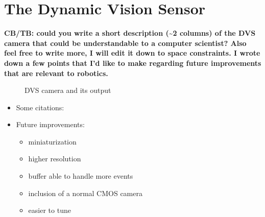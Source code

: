 
\section{The Dynamic Vision Sensor\label{sec:The-DVS-camera}}

\textbf{CB/TB: could you write a short description (\textasciitilde{}2
columns) of the DVS camera that could be understandable to a computer
scientist? Also feel free to write more, I will edit it down to space
constraints. I wrote down a few points that I'd like to make regarding
future improvements that are relevant to robotics.}

\begin{figure}[b]
\hfill{}\hfill{}\hfill{}\hfill{}

\caption{\label{fig:DVS-camera}DVS camera and its output}
\end{figure}


\lorem

\lorem

\lorem

\lorem

\lorem

\lorem

\lorem

\lorem

\lorem

\lorem
\begin{itemize}
\item Some citations: \cite{boerlin09getting}\cite{lichtsteiner08asynchronous}\cite{etienne-cummings99intelligent}\cite{oster08quantification}
\item Future improvements:

\begin{itemize}
\item miniaturization
\item higher resolution
\item buffer able to handle more events
\item inclusion of a normal CMOS camera
\item easier to tune\end{itemize}
\end{itemize}

